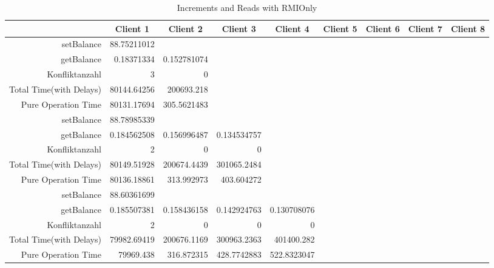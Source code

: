 \begin{landscape}
\begin{table}[htbp]
\scriptsize
  \centering
  \caption{Increments and Reads with RMIOnly}
    \begin{tabular}{rrrrrrrrr}
    \toprule
          & \multicolumn{1}{c}{Client 1} & \multicolumn{1}{c}{Client 2} & \multicolumn{1}{c}{Client 3} & \multicolumn{1}{c}{Client 4} & \multicolumn{1}{c}{Client 5} & \multicolumn{1}{c}{Client 6} & \multicolumn{1}{c}{Client 7} & \multicolumn{1}{c}{Client 8} \\
    \midrule
    setBalance & 88.75211012 &       &       &       &       &       &       &  \\
    getBalance & 0.18371334 & 0.152781074 &       &       &       &       &       &  \\
    Konfliktanzahl & 3     & 0     &       &       &       &       &       &  \\
    Total Time(with Delays) & 80144.64256 & 200693.218 &       &       &       &       &       &  \\
    Pure Operation Time & 80131.17694 & 305.5621483 &       &       &       &       &       &  \\
\cline{1-9}    
    setBalance & 88.78985339 &       &       &       &       &       &       &  \\
    getBalance & 0.184562508 & 0.156996487 & 0.134534757 &       &       &       &       &  \\
    Konfliktanzahl & 2     & 0     & 0     &       &       &       &       &  \\
    Total Time(with Delays) & 80149.51928 & 200674.4439 & 301065.2484 &       &       &       &       &  \\
    Pure Operation Time & 80136.18861 & 313.992973 & 403.604272 &       &       &       &       &  \\
\cline{1-9}    
    setBalance & 88.60361699 &       &       &       &       &       &       &  \\
    getBalance & 0.185507381 & 0.158436158 & 0.142924763 & 0.130708076 &       &       &       &  \\
    Konfliktanzahl & 2     & 0     & 0     & 0     &       &       &       &  \\
    Total Time(with Delays) & 79982.69419 & 200676.1169 & 300963.2363 & 401400.282 &       &       &       &  \\
    Pure Operation Time & 79969.438 & 316.872315 & 428.7742883 & 522.8323047 &       &       &       &  \\

\end{tabular}
\end{table}
\end{landscape}
